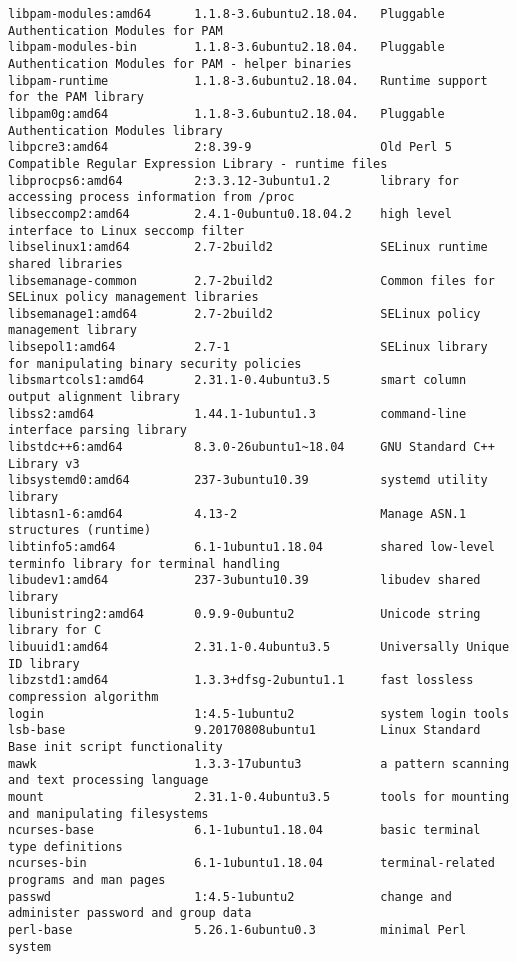 \begin{tcolorbox}[breakable,colback=yellow!5!black]
\begin{verbatim}
libpam-modules:amd64      1.1.8-3.6ubuntu2.18.04.   Pluggable Authentication Modules for PAM
libpam-modules-bin        1.1.8-3.6ubuntu2.18.04.   Pluggable Authentication Modules for PAM - helper binaries
libpam-runtime            1.1.8-3.6ubuntu2.18.04.   Runtime support for the PAM library
libpam0g:amd64            1.1.8-3.6ubuntu2.18.04.   Pluggable Authentication Modules library
libpcre3:amd64            2:8.39-9                  Old Perl 5 Compatible Regular Expression Library - runtime files
libprocps6:amd64          2:3.3.12-3ubuntu1.2       library for accessing process information from /proc
libseccomp2:amd64         2.4.1-0ubuntu0.18.04.2    high level interface to Linux seccomp filter
libselinux1:amd64         2.7-2build2               SELinux runtime shared libraries
libsemanage-common        2.7-2build2               Common files for SELinux policy management libraries
libsemanage1:amd64        2.7-2build2               SELinux policy management library
libsepol1:amd64           2.7-1                     SELinux library for manipulating binary security policies
libsmartcols1:amd64       2.31.1-0.4ubuntu3.5       smart column output alignment library
libss2:amd64              1.44.1-1ubuntu1.3         command-line interface parsing library
libstdc++6:amd64          8.3.0-26ubuntu1~18.04     GNU Standard C++ Library v3
libsystemd0:amd64         237-3ubuntu10.39          systemd utility library
libtasn1-6:amd64          4.13-2                    Manage ASN.1 structures (runtime)
libtinfo5:amd64           6.1-1ubuntu1.18.04        shared low-level terminfo library for terminal handling
libudev1:amd64            237-3ubuntu10.39          libudev shared library
libunistring2:amd64       0.9.9-0ubuntu2            Unicode string library for C
libuuid1:amd64            2.31.1-0.4ubuntu3.5       Universally Unique ID library
libzstd1:amd64            1.3.3+dfsg-2ubuntu1.1     fast lossless compression algorithm
login                     1:4.5-1ubuntu2            system login tools
lsb-base                  9.20170808ubuntu1         Linux Standard Base init script functionality
mawk                      1.3.3-17ubuntu3           a pattern scanning and text processing language
mount                     2.31.1-0.4ubuntu3.5       tools for mounting and manipulating filesystems
ncurses-base              6.1-1ubuntu1.18.04        basic terminal type definitions
ncurses-bin               6.1-1ubuntu1.18.04        terminal-related programs and man pages
passwd                    1:4.5-1ubuntu2            change and administer password and group data
perl-base                 5.26.1-6ubuntu0.3         minimal Perl system

\end{verbatim}
\end{tcolorbox}
